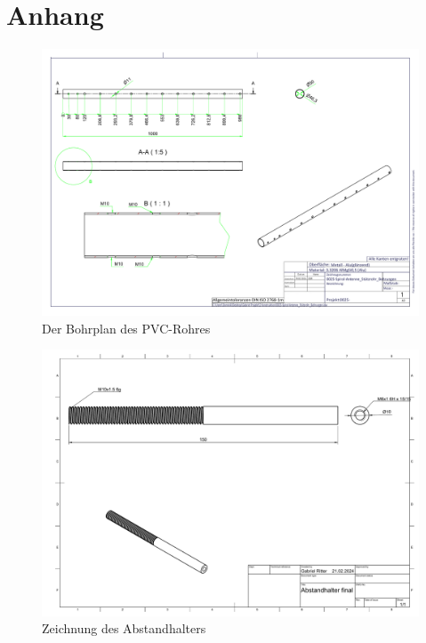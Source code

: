 \chapter{Anhang}
\label{chap:Anhang}
	\begin{figure}[h!]
	\centering
	\includegraphics[angle=90,width=\textwidth]{../ref/0025-Spiral-Antenne_St_tzrohr_Bohrungen.pdf}
	\caption{Der Bohrplan des PVC-Rohres}
	\label{fig:PVCU-Rohr-Bohrplan}
\end{figure}

	\begin{figure}[h!]
	\centering
	\includegraphics[angle=90,width=\textwidth]{../ref/Abstandhalter final Zeichnung v2.pdf}
	\caption{Zeichnung des Abstandhalters}
	\label{fig:Abstandhalter-Zeichnung}
\end{figure}

